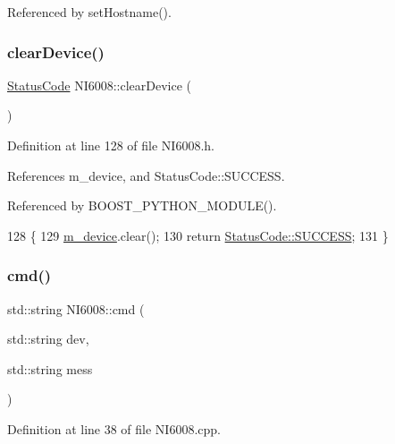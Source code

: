 Referenced by set\+Hostname().

\mbox{\label{classNI6008_a0cdfc8c62074d5bbc212e1825ac10e99}} 
\subsubsection{\texorpdfstring{clear\+Device()}{clearDevice()}}
{\footnotesize\ttfamily \hyperlink{classStatusCode}{Status\+Code} N\+I6008\+::clear\+Device (\begin{DoxyParamCaption}{ }\end{DoxyParamCaption})\hspace{0.3cm}{\ttfamily [inline]}}



Definition at line 128 of file N\+I6008.\+h.



References m\+\_\+device, and Status\+Code\+::\+S\+U\+C\+C\+E\+SS.



Referenced by B\+O\+O\+S\+T\+\_\+\+P\+Y\+T\+H\+O\+N\+\_\+\+M\+O\+D\+U\+L\+E().


\begin{DoxyCode}
128                           \{
129     \hyperlink{classNI6008_ac7225d517d42b1b7553dc75dccb29b58}{m\_device}.clear();
130     \textcolor{keywordflow}{return} \hyperlink{classStatusCode_a6f565cbeadc76d14c72f047e5e85eb4badd0da38d3ba0d922efd1f4619bc37ad8}{StatusCode::SUCCESS};
131   \}
\end{DoxyCode}
\mbox{\label{classNI6008_a0d7584a656abca03fd59c555cb66822c}} 
\subsubsection{\texorpdfstring{cmd()}{cmd()}}
{\footnotesize\ttfamily std\+::string N\+I6008\+::cmd (\begin{DoxyParamCaption}\item[{std\+::string}]{dev,  }\item[{std\+::string}]{mess }\end{DoxyParamCaption})}



Definition at line 38 of file N\+I6008.\+cpp.



